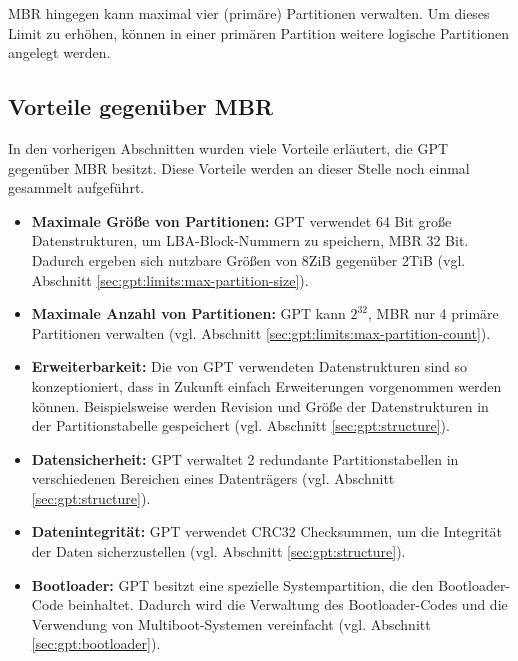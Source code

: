 MBR hingegen kann maximal vier (primäre) Partitionen verwalten.
Um dieses Limit zu erhöhen, können in einer primären Partition weitere logische Partitionen angelegt werden.

\subsection{Vorteile gegenüber MBR}
\label{sec:gpt:advantages}

In den vorherigen Abschnitten wurden viele Vorteile erläutert, die GPT gegenüber MBR besitzt.
Diese Vorteile werden an dieser Stelle noch einmal gesammelt aufgeführt.

\begin{itemize}
    \item \textbf{Maximale Größe von Partitionen:}
    GPT verwendet 64 Bit große Datenstrukturen, um LBA-Block-Nummern zu speichern, MBR 32 Bit.
    Dadurch ergeben sich nutzbare Größen von 8ZiB gegenüber 2TiB (vgl. Abschnitt \ref{sec:gpt:limits:max-partition-size}).

    \item \textbf{Maximale Anzahl von Partitionen:}
    GPT kann $ 2^{32} $, MBR nur 4 primäre Partitionen verwalten (vgl. Abschnitt \ref{sec:gpt:limits:max-partition-count}).

    \item \textbf{Erweiterbarkeit:}
    Die von GPT verwendeten Datenstrukturen sind so konzeptioniert, dass in Zukunft einfach Erweiterungen vorgenommen werden können.
    Beispielsweise werden Revision und Größe der Datenstrukturen in der Partitionstabelle gespeichert (vgl. Abschnitt \ref{sec:gpt:structure}).

    \item \textbf{Datensicherheit:} 
    GPT verwaltet 2 redundante Partitionstabellen in verschiedenen Bereichen eines Datenträgers (vgl. Abschnitt \ref{sec:gpt:structure}).
    
    \item \textbf{Datenintegrität:}
    GPT verwendet CRC32 Checksummen, um die Integrität der Daten sicherzustellen (vgl. Abschnitt \ref{sec:gpt:structure}).

    \item \textbf{Bootloader:}
    GPT besitzt eine spezielle Systempartition, die den Bootloader-Code beinhaltet.
    Dadurch wird die Verwaltung des Bootloader-Codes und die Verwendung von Multiboot-Systemen vereinfacht (vgl. Abschnitt \ref{sec:gpt:bootloader}).
\end{itemize}

